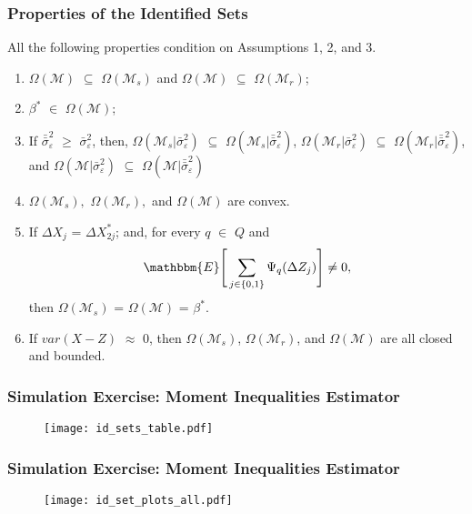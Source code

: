 \begin{frame}
\frametitle{Properties of the Identified Sets}

All the following properties condition on Assumptions 1, 2, and 3.
\begin{enumerate}
	\item $\Omega(\mathcal{M})$ $\subseteq$ $\Omega(\mathcal{M}_{s})$ and $\Omega(\mathcal{M})$ $\subseteq$ $\Omega(\mathcal{M}_{r})$;
	\item $\beta^{*}$ $\in$ $\Omega(\mathcal{M})$;
	\item If $\bar{\bar{\sigma}}^{2}_{\varepsilon}$ $\geq$ $\bar{\sigma}^{2}_{\varepsilon}$, then, $\Omega(\mathcal{M}_{s}|\bar{\sigma}^{2}_{\varepsilon})$ $\subseteq$ $\Omega(\mathcal{M}_{s}|\bar{\bar{\sigma}}^{2}_{\varepsilon})$, $\Omega(\mathcal{M}_{r}|\bar{\sigma}^{2}_{\varepsilon})$ $\subseteq$ $\Omega(\mathcal{M}_{r}|\bar{\bar{\sigma}}^{2}_{\varepsilon})$, and $\Omega(\mathcal{M}|\bar{\sigma}^{2}_{\varepsilon})$ $\subseteq$ $\Omega(\mathcal{M}|\bar{\bar{\sigma}}^{2}_{\varepsilon})$
	\item $\Omega(\mathcal{M}_{s}),$ $\Omega(\mathcal{M}_{r}),$ and $\Omega(\mathcal{M})$ are convex.
	\item If $\Delta X_{j}$ = $\Delta X^{*}_{2j}$; and, for every $q$ $\in$ $Q$ and
	\begin{align*}
	\mathbbm{E}\Bigg[\sum_{j\in\{0,1\}}\Psi_{q}(\Delta Z_{j})\Bigg] \neq 0,
	\end{align*}
	then $\Omega(\mathcal{M}_{s})$ = $\Omega(\mathcal{M})$ = $\beta^{*}$.
	\item If $var(X-Z)$ $\approx$ $0$, then $\Omega(\mathcal{M}_{s})$, $\Omega(\mathcal{M}_{r})$, and $\Omega(\mathcal{M})$ are all closed and bounded.
\end{enumerate}
\end{frame}
\begin{frame}
\frametitle{Simulation Exercise: Moment Inequalities Estimator}

\begin{figure}[h!]
\centering \texttt{[image: id\_sets\_table.pdf]}
\end{figure}

\end{frame}
\begin{frame}
\frametitle{Simulation Exercise: Moment Inequalities Estimator}

\begin{figure}[h!]
\centering \texttt{[image: id\_set\_plots\_all.pdf]}
\end{figure}

\end{frame}
